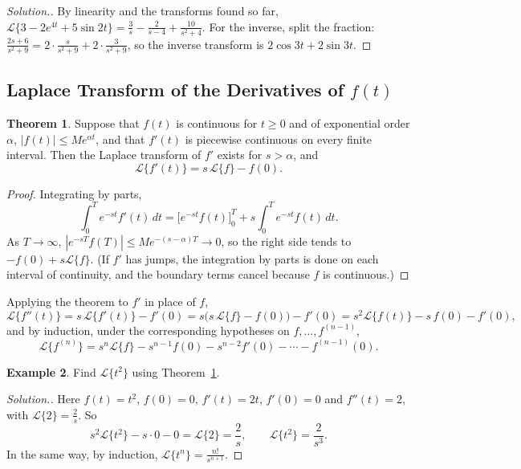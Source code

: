 \documentclass[11pt,a4paper]{article}
\theoremstyle{definition}
\newtheorem{thm}{Theorem}[subsection]
\newtheorem{exa}[thm]{Example}
\newenvironment{solution}
  {\renewcommand{\qedsymbol}{}\begin{proof}[\textit{Solution}.]}
  {\end{proof}}
\begin{document}
\begin{solution}
By linearity and the transforms found so far,
$\mathcal{L}\{3 - 2e^{4t} + 5\sin 2t\} = \frac3s - \frac{2}{s - 4} +
\frac{10}{s^2 + 4}$. For the inverse, split the fraction:
$\frac{2s + 6}{s^2 + 9} = 2\cdot\frac{s}{s^2 + 9} + 2\cdot\frac{3}{s^2 + 9}$, so
the inverse transform is $2\cos 3t + 2\sin 3t$.
\end{solution}

{\color[wave]{485}\subsection{Laplace Transform of the Derivatives of $f(t)$}}

\begin{thm}
\label{thm:lapderiv}
Suppose that $f(t)$ is continuous for $t\geq 0$ and of exponential order
$\alpha$, $|f(t)|\leq Me^{\alpha t}$, and that $f'(t)$ is piecewise continuous on
every finite interval. Then the Laplace transform of $f'$ exists for $s>\alpha$,
and
\[\mathcal{L}\{f'(t)\} = s\, \mathcal{L}\{f\} - f(0) .\]
\end{thm}

\begin{proof}
Integrating by parts,
\[\int_0^T e^{-st}f'(t)\,dt = \Big[e^{-st}f(t)\Big]_0^T + s\int_0^Te^{-st}f(t)\,dt
.\]
As $T\to\infty$, $|e^{-sT}f(T)|\leq Me^{-(s-\alpha)T}\to 0$, so the right side
tends to $-f(0) + s\mathcal{L}\{f\}$. (If $f'$ has jumps, the integration by
parts is done on each interval of continuity, and the boundary terms cancel
because $f$ is continuous.)
\end{proof}

Applying the theorem to $f'$ in place of $f$,
\[\mathcal{L}\{f''(t)\} = s\, \mathcal{L}\{f'(t)\} - f'(0) = s\big(s\,
\mathcal{L}\{f\} -f(0)\big) -f'(0) = s^2\mathcal{L}\{f(t)\} - s\, f(0) -
f'(0) ,\]
and by induction, under the corresponding hypotheses on $f,\dots,f^{(n-1)}$,
\[\mathcal{L}\{f^{(n)}\} = s^n \mathcal{L}\{f\} - s^{n-1}f(0)- s^{n-2}f'(0) -
\cdots - f^{(n-1)}(0) .\]

\begin{exa}
\label{ex:lapt2}
Find $\mathcal{L}\{t^2\}$ using Theorem~\ref{thm:lapderiv}.
\end{exa}

\begin{solution}
Here $f(t) = t^2$, $f(0) = 0$, $f'(t) = 2t$, $f'(0) = 0$ and $f''(t) = 2$, with
$\mathcal{L}\{2\} = \frac{2}{s}$. So
\[s^2\mathcal{L}\{t^2\} - s\cdot 0 - 0 = \mathcal{L}\{2\} = \frac2s,\qquad
\mathcal{L}\{t^2\} = \frac{2}{s^3} .\]
In the same way, by induction, $\mathcal{L}\{t^n\} = \frac{n!}{s^{n+1}}$.
\end{solution}
\end{document}
